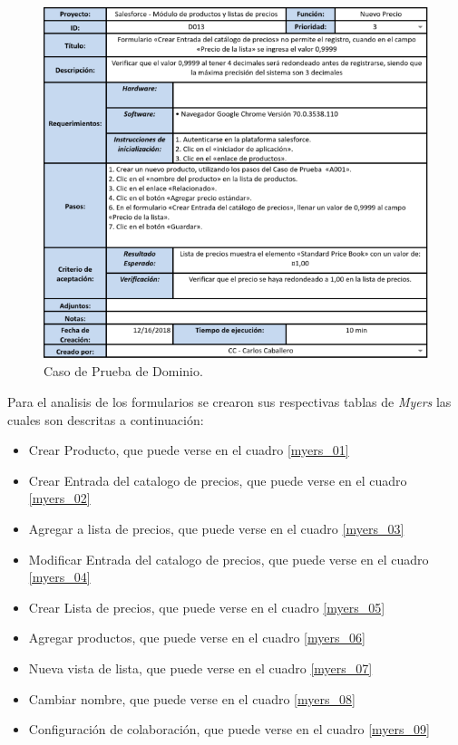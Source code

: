 \begin{figure}
\centering
\includegraphics[width=1.0\textwidth]{graphics/tc3-domain.eps}
\caption{Caso de Prueba de Dominio.}
\label{tc_domain}
\end{figure}

Para el analisis de los formularios se crearon sus respectivas tablas de
\emph{Myers} las cuales son descritas a continuación:

\begin{itemize}
\item Crear Producto, que puede verse en el cuadro \ref{myers_01}
\item Crear Entrada del catalogo de precios, que puede verse en el cuadro \ref{myers_02}
\item Agregar a lista de precios, que puede verse en el cuadro \ref{myers_03}
\item Modificar Entrada del catalogo de precios, que puede verse en el cuadro \ref{myers_04}
\item Crear Lista de precios, que puede verse en el cuadro \ref{myers_05}
\item Agregar productos, que puede verse en el cuadro \ref{myers_06}
\item Nueva vista de lista, que puede verse en el cuadro \ref{myers_07}
\item Cambiar nombre, que puede verse en el cuadro \ref{myers_08}
\item Configuración de colaboración, que puede verse en el cuadro \ref{myers_09}
\end{itemize}

